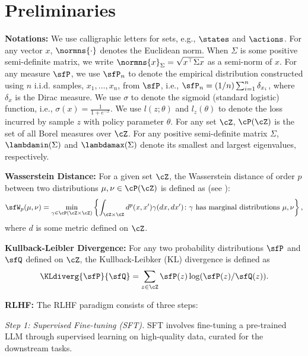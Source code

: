 \section{Preliminaries}

\textbf{Notations: } We use calligraphic letters for sets, e.g., $\states$ and $\actions$. For any vector $x$, $\normns{\cdot}$ denotes the Euclidean norm. When $\Sigma$ is some positive semi-definite matrix, we write $\normns{x}_{\Sigma}=\sqrt{x^{\top}\Sigma x}$ as a semi-norm of $x$. For any measure $\sfP$, we use $\sfP_n$ to denote the empirical distribution constructed using $n$ i.i.d. samples, $x_1,\dots,x_n$, from $\sfP$, i.e., $\sfP_n = (1/n)\sum_{i=1}^n\delta_{x_i}$, where $\delta_x$ is the Dirac measure. We use $\sigma$ to denote the sigmoid (standard logistic) function, i.e., $\sigma(x)=\frac{1}{1+e^{-x}}$. We use $l(z;\theta)$ and $l_z(\theta)$ to denote the loss incurred by sample $z$ with policy parameter $\theta$. For any set $\cZ$, $\cP(\cZ)$ is the set of all Borel measures over $\cZ$. For any positive semi-definite matrix $\Sigma$, $\lambdamin(\Sigma)$ and $\lambdamax(\Sigma)$ denote its smallest and largest eigenvalues, respectively. 

\textbf{Wasserstein Distance: } For a given set $\cZ$, the Wasserstein distance of order $p$ between two distributions $\mu,\nu\in\cP(\cZ)$ is defined as (see \citet{villani2009optimal}):
    \begin{align}\label{eq:wasserstein-distance-equation}
        \sfW_p(\mu,\nu) = \min_{\gamma\in\cP(\cZ\times\cZ)} \left\{ \int_{\cZ\times\cZ} d^p(x, x')\gamma(dx,dx') \colon \text{$\gamma$ has marginal distributions $\mu,\nu$}\right\},
    \end{align}
where $d$ is some metric defined on $\cZ$. 

\textbf{Kullback-Leibler Divergence: } For any two probability distributions $\sfP$ and $\sfQ$ defined on $\cZ$, the Kullback-Leibker (KL) divergence is defined as
\begin{align}
    \KLdiverg{\sfP}{\sfQ} = \sum_{z\in\cZ} \sfP(z) \log (\sfP(z)/\sfQ(z)).
\end{align}


\textbf{RLHF: }\label{sec:prelim-rlhf} The RLHF paradigm   consists of three steps:

\textit{Step 1: Supervised Fine-tuning (SFT).} SFT involves fine-tuning a pre-trained LLM through supervised learning on high-quality data,  curated for the downstream tasks.

